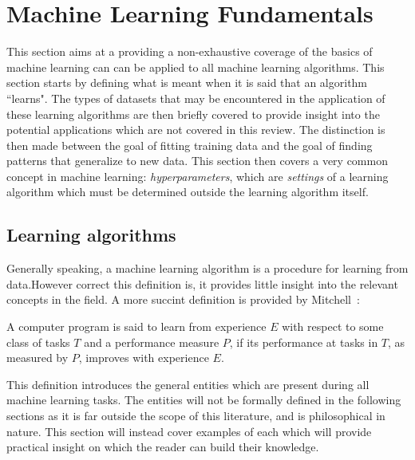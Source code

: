 \section{Machine Learning Fundamentals}
This section aims at a providing a non-exhaustive coverage of the basics of
machine learning can can be applied to all machine learning algorithms. This
section starts by defining what is meant when it is said that an algorithm
``learns". The types of datasets that may be encountered in the application of
these learning algorithms are then briefly covered to provide insight into the
potential applications which are not covered in this review. The distinction is
then made between the goal of fitting training data and the goal of finding
patterns that generalize to new data. This section then covers a very common
concept in machine learning: \textit{hyperparameters}, which are
\textit{settings} of a learning algorithm which must be determined outside the
learning algorithm itself.

\subsection{Learning algorithms\label{ssec:learning_algo}}
Generally speaking, a machine learning algorithm is a procedure for learning
from data.However correct this definition is, it provides little insight into
the relevant concepts in the field. A more succint definition is provided by
Mitchell~\cite{Mitchell97LearningAlgorithm}:

\begin{fancyquotes}
    A computer program is said to learn from experience $E$ with respect
    to some class of tasks $T$ and a performance measure $P$, if its performance
    at tasks in $T$, as measured by $P$, improves with experience $E$.
\end{fancyquotes}

This definition introduces the general entities which are present during all
machine learning tasks. The entities will not be formally defined in the
following sections as it is far outside the scope of this literature, and is
philosophical in nature. This section will instead cover examples of each which
will provide practical insight on which the reader can build their knowledge.

